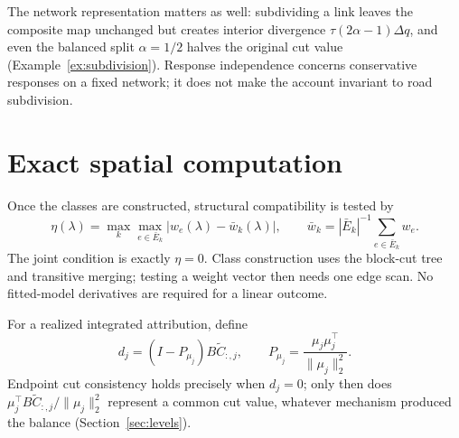 \documentclass[a4paper,fleqn]{cas-sc}
\newcommand{\norm}[1]{\lVert #1 \rVert}
\begin{document}
The network representation matters as well: subdividing a link leaves
the composite map unchanged but creates interior divergence
$\tau(2\alpha-1)\Delta q$, and even the balanced split $\alpha=1/2$
halves the original cut value (Example~\ref{ex:subdivision}).
Response independence concerns conservative responses on a fixed network;
it does not make the account invariant to road subdivision.

\section{Exact spatial computation}\label{sec:stability}\label{sec:algorithm}
Once the classes are constructed, structural compatibility is tested by
\[
\eta(\lambda)=\max_k\max_{e\in\bar E_k}|w_e(\lambda)-\bar w_k(\lambda)|,
\qquad
\bar w_k=|\bar E_k|^{-1}\sum_{e\in\bar E_k}w_e.
\]
The joint condition is exactly $\eta=0$. Class construction uses the
block-cut tree and transitive merging; testing a weight vector then needs
one edge scan. No fitted-model derivatives are required for a linear outcome.

For a realized integrated attribution, define
\begin{equation}
d_j=(I-P_{\mu_j})B\widetilde C_{:,j},\qquad
P_{\mu_j}=\frac{\mu_j\mu_j^\top}{\norm{\mu_j}_2^2}.
\label{eq:endpointd}
\end{equation}
Endpoint cut consistency holds precisely when $d_j=0$; only then does
$\mu_j^\top B\widetilde C_{:,j}/\norm{\mu_j}_2^2$ represent a common cut
value, whatever mechanism produced the balance
(Section~\ref{sec:levels}).
\end{document}
